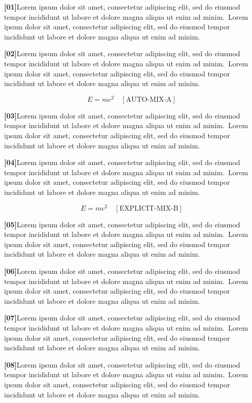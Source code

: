 \documentclass[twocolumn]{article}
\newcommand\Body{Lorem ipsum dolor sit amet, consectetur adipiscing elit, sed do
eiusmod tempor incididunt ut labore et dolore magna aliqua ut enim ad minim.}
\newcommand\Par[1]{\par\noindent\textbf{[#1]}\space\Body\ \Body\par\medskip}
\begin{document}
\Par{01}\Par{02}
\begin{wideband}\[ E=mc^2 \quad[\text{AUTO-MIX-A}] \]\end{wideband}
\Par{03}\Par{04}
\begin{wideband}[260pt]\[ E=mc^2 \quad[\text{EXPLICIT-MIX-B}] \]\end{wideband}
\Par{05}\Par{06}\Par{07}\Par{08}
\end{document}
